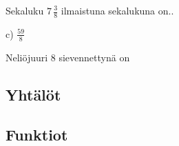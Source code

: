 \begin{tehtava}
Sekaluku $7\,\frac{3}{8}$ ilmaistuna sekalukuna on..
\begin{alakohdat}
\end{alakohdat}
    \begin{vastaus}
	 c) $\frac{59}{8}$
    \end{vastaus}
\end{tehtava}

\begin{tehtava}
Neliöjuuri 8 sievennettynä on
\begin{alakohdat}
\end{alakohdat}
\end{tehtava}

\subsection*{Yhtälöt}

\subsection*{Funktiot}
